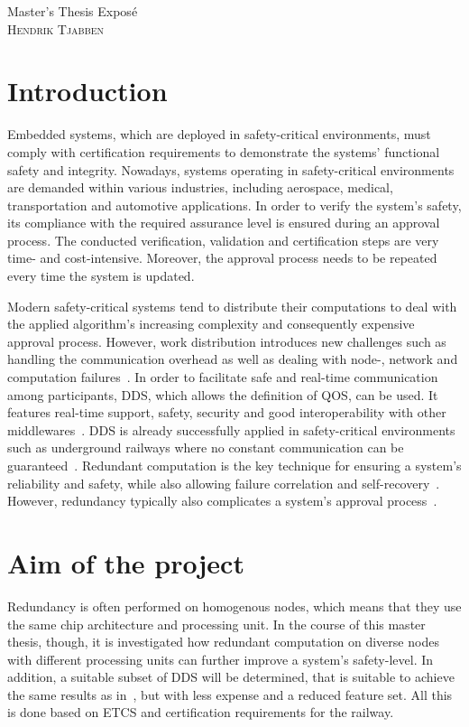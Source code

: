 \documentclass[a4paper, 12pt]{scrartcl}
\begin{document}
\begin{center}
  \Huge{Master's Thesis Expos\'{e}}\\
  \large{\textsc{Hendrik Tjabben}}
\end{center}

\section*{Introduction}
Embedded systems, which are deployed in safety-critical environments, must comply with certification requirements to demonstrate the systems' functional safety and integrity.
Nowadays, systems operating in safety-critical environments are demanded within various industries, including aerospace, medical, transportation and automotive applications.
In order to verify the system's safety, its compliance with the required assurance level is ensured during an approval process.
The conducted verification, validation and certification steps are very time- and cost-intensive.
Moreover, the approval process needs to be repeated every time the system is updated.

Modern safety-critical systems tend to distribute their computations to deal with the applied algorithm's increasing complexity and consequently expensive approval process.
However, work distribution introduces new challenges such as handling the communication overhead as well as dealing with node-, network and computation failures~\cite{DistributedSafety2020}.
In order to facilitate safe and real-time communication among participants, \ac{DDS}, which allows the definition of \ac{QOS}, can be used.
It features real-time support, safety, security and good interoperability with other middlewares~\cite{DistributedSafety2020}.
\ac{DDS} is already successfully applied in safety-critical environments such as underground railways where no constant communication can be guaranteed~\cite{DDSInURail}.
Redundant computation is the key technique for ensuring a system's reliability and safety, while also allowing failure correlation and self-recovery~\cite{TanenbaumSteen07}.
However, redundancy typically also complicates a system's approval process~\cite{ReliabilityThroughRedundancy}.

\section*{Aim of the project}
Redundancy is often performed on homogenous nodes, which means that they use the same chip architecture and processing unit.
In the course of this master thesis, though, it is investigated how redundant computation on diverse nodes with different processing units can further improve a system's safety-level.
In addition, a suitable subset of \ac{DDS} will be determined, that is suitable to achieve the same results as in~\cite{DistributedSafety2020}, but with less expense and a reduced feature set.
All this is done based on \ac{ETCS} and certification requirements for the railway.
\end{document}

